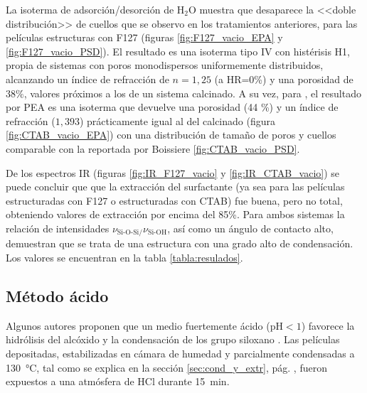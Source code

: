 		 La isoterma de adsorción/desorción de H$_2$O muestra que desaparece la <<doble distribución>> de cuellos que se observo en los tratamientos anteriores, para las películas estructuras con F127 (figuras \ref{fig:F127_vacio_EPA} y \ref{fig:F127_vacio_PSD}). El resultado es una isoterma tipo IV con histérisis H1, propia de sistemas con poros monodispersos uniformemente distribuidos, alcanzando un índice de refracción de $n=1,25$ (a HR=0\%) y una porosidad de $38\%$, valores próximos a los de un sistema calcinado. A su vez, para \pdmC, el resultado por PEA es una isoterma que devuelve una porosidad (44 \%) y un índice de refracción ($1,393$) prácticamente igual al del calcinado (figura \ref{fig:CTAB_vacio_EPA}) con una distribución de tamaño de poros y cuellos comparable con la reportada por Boissiere\cite{Boissiere2005} \ref{fig:CTAB_vacio_PSD}.

		 De los espectros IR  (figuras \ref{fig:IR_F127_vacio} y \ref{fig:IR_CTAB_vacio}) se puede concluir que que la extracción del surfactante (ya sea para las películas estructuradas con F127 o estructuradas con CTAB) fue buena, pero no total, obteniendo valores de extracción por encima del 85\%. Para ambos sistemas la relación de intensidades $\nu_{\text{Si-O-Si/}}\nu_{\text{Si-OH}}$, así como un ángulo de contacto alto, demuestran que se trata de una estructura con una grado alto de condensación. Los valores se encuentran en la tabla \ref{tabla:resulados}.


	 \subsection{Método ácido}

	 	 Algunos autores proponen que un medio fuertemente ácido (pH$<1$) favorece la hidrólisis del alcóxido y la condensación de los grupo siloxano \cite{Soler-Illia2011,Doshi2000a,Boissiere2000,Huo1996,Beck1992}. Las películas depositadas, estabilizadas en cámara de humedad y  parcialmente condensadas a \SI{130}{\celsius}, tal como se explica en la sección \ref{sec:cond_y_extr}, pág. \pageref{sec:cond_y_extr}, fueron expuestos a una atmósfera de HCl durante \SI{15}{\minute}. 

